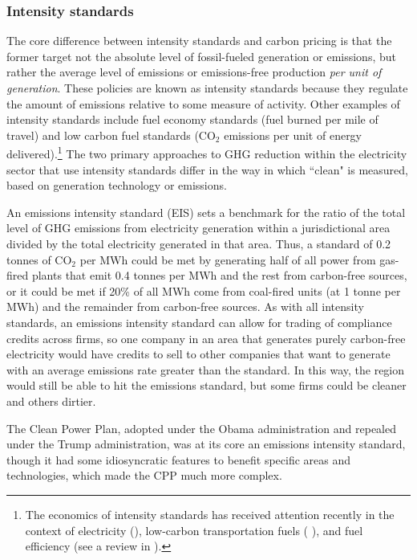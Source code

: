 \documentclass[12pt]{article}
\begin{document}
\subsubsection{Intensity standards}  The core difference between intensity standards and carbon pricing is that the former target not the absolute level of fossil-fueled generation or emissions, but rather the average level of emissions or emissions-free production {\it per unit of generation}.  These policies are known as intensity standards because they regulate the amount of emissions relative to some measure of activity. Other examples of intensity standards include fuel economy standards (fuel burned per mile of travel) and low carbon fuel standards (CO$_2$ emissions per unit of energy delivered).\footnote{The economics of intensity standards has received attention recently in the context of electricity (\cite{fischer2010renewable}), low-carbon transportation fuels (\cite{holland2009greenhouse} ), and fuel efficiency (see a review in \cite{anderson2016designing}).}  The two primary approaches to GHG reduction within the electricity sector that use intensity standards differ in the way in which ``clean" is measured, based on generation technology or emissions.

\medskip{}  An emissions intensity standard (EIS) sets a benchmark for the ratio of the total level of GHG emissions from electricity generation within a jurisdictional area divided by the total electricity generated in that area.  Thus, a standard of 0.2 tonnes of CO$_2$ per MWh could be met by generating half of all power from gas-fired plants that emit 0.4 tonnes per MWh and the rest from carbon-free sources, or it could be met if 20\% of all MWh come from coal-fired units (at 1 tonne per MWh) and the remainder from carbon-free sources. As with all intensity standards, an emissions intensity standard can allow for trading of compliance credits across firms, so one company in an area that generates purely carbon-free electricity would have credits to sell to other companies that want to generate with an average emissions rate greater than the standard. In this way, the region would still be able to hit the emissions standard, but some firms could be cleaner and others dirtier.

The Clean Power Plan, adopted under the Obama administration and repealed under the Trump administration, was at its core an emissions intensity standard, though it had some idiosyncratic features to benefit specific areas and technologies, which made the CPP much more complex.
\end{document}
